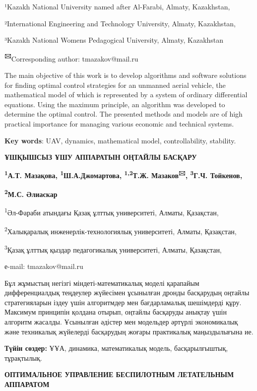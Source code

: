 ¹Kazakh National University named after Al-Farabi, Almaty, Kazakhstan,

²International Engineering and Technology University, Almaty,
Kazakhstan,

³Kazakh National Women\textquotesingle s Pedagogical University, Almaty,
Kazakhstan

{\bfseries \textsuperscript{🖂}}Corresponding author: tmazakov@mail.ru

The main objective of this work is to develop algorithms and software
solutions for finding optimal control strategies for an unmanned aerial
vehicle, the mathematical model of which is represented by a system of
ordinary differential equations. Using the maximum principle, an
algorithm was developed to determine the optimal control. The presented
methods and models are of high practical importance for managing various
economic and technical systems.

{\bfseries Key words}: UAV, dynamics, mathematical model, controllability,
stability.

{\bfseries ҰШҚЫШСЫЗ ҰШУ АППАРАТЫН ОҢТАЙЛЫ БАСҚАРУ}

{\bfseries \textsuperscript{1}А.Т. Мазақова,
\textsuperscript{1}Ш.А.Джомартова, \textsuperscript{1,2}Т.Ж.
Мазаков\textsuperscript{🖂}, \textsuperscript{3}Г.Ч. Тойкенов,}

{\bfseries \textsuperscript{2}М.С. Әлиаскар}

\textsuperscript{1}Әл-Фараби атындағы Қазақ ұлттық университеті, Алматы,
Қазақстан,

\textsuperscript{2}Халықаралық инженерлік-технологиялық университеті,
Алматы, Қазақстан,

\textsuperscript{3}Қазақ ұлттық қыздар педагогикалық университеті,
Алматы, Қазақстан,

е-mail: tmazakov@mail.ru

Бұл жұмыстың негізгі міндеті-математикалық моделі қарапайым
дифференциалдық теңдеулер жүйесімен ұсынылған дронды басқарудың оңтайлы
стратегияларын іздеу үшін алгоритмдер мен бағдарламалық шешімдерді құру.
Максимум принципін қолдана отырып, оңтайлы басқаруды анықтау үшін
алгоритм жасалды. Ұсынылған әдістер мен модельдер әртүрлі экономикалық
және техникалық жүйелерді басқарудың жоғары практикалық маңыздылығына
ие.

{\bfseries Түйін сөздер:} ҰҰА, динамика, математикалық модель,
басқарылғыштық, тұрақтылық.

{\bfseries ОПТИМАЛЬНОЕ УПРАВЛЕНИЕ БЕСПИЛОТНЫМ ЛЕТАТЕЛЬНЫМ АППАРАТОМ}

